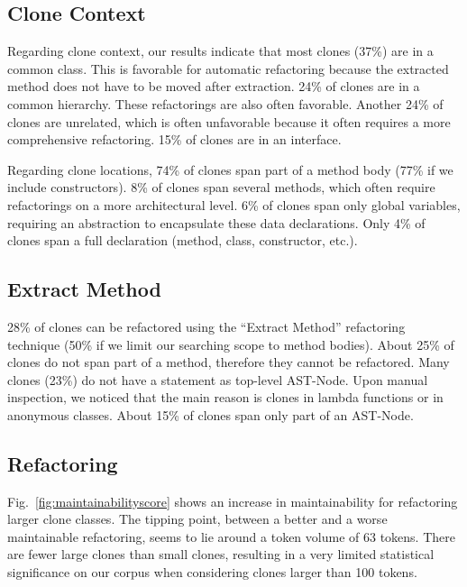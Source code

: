 \documentclass[sigconf,review,anonymous]{acmart}
\begin{document}

\subsection{Clone Context}
Regarding clone context, our results indicate that most clones (37\%) are in a common class. This is favorable for automatic refactoring because the extracted method does not have to be moved after extraction. 24\% of clones are in a common hierarchy. These refactorings are also often favorable. Another 24\% of clones are unrelated, which is often unfavorable because it often requires a more comprehensive refactoring. 15\% of clones are in an interface. %

Regarding clone locations, 74\% of clones span part of a method body (77\% if we include constructors). 8\% of clones span several methods, which often require refactorings on a more architectural level. 6\% of clones span only global variables, requiring an abstraction to encapsulate these data declarations. Only 4\% of clones span a full declaration (method, class, constructor, etc.).

\subsection{Extract Method}
28\% of clones can be refactored using the ``Extract Method'' refactoring technique (50\% if we limit our searching scope to method bodies). About 25\% of clones do not span part of a method, therefore they cannot be refactored. Many clones (23\%) do not have a statement as top-level AST-Node. Upon manual inspection, we noticed that the main reason is clones in lambda functions or in anonymous classes. About 15\% of clones span only part of an AST-Node.%

\subsection{Refactoring}
Fig.~\ref{fig:maintainabilityscore} shows an increase in maintainability for refactoring larger clone classes. The tipping point, between a better and a worse maintainable refactoring, seems to lie around a token volume of 63 tokens. There are fewer large clones than small clones, resulting in a very limited %
statistical significance on our corpus when considering clones larger than 100 tokens.
\end{document}
